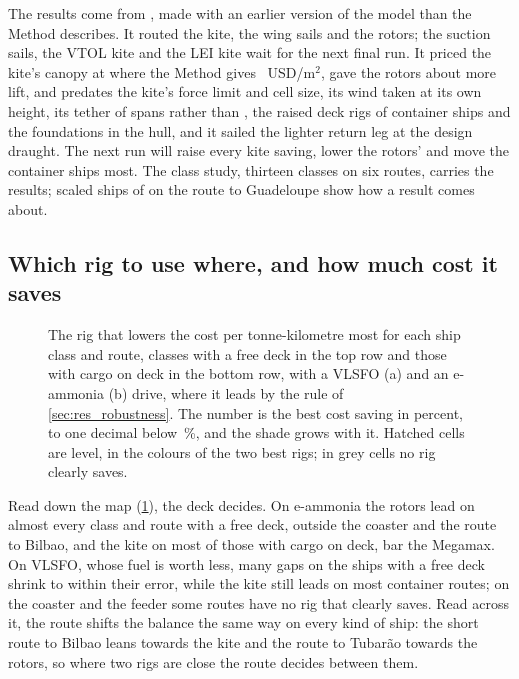 The results come from \NumResultsRun{}, made with an earlier version of the model than the Method describes. It routed the kite, the wing sails and the rotors; the suction sails, the VTOL kite and the LEI kite wait for the next final run. It priced the kite's canopy at  where the Method gives \NumCanopyPrice{}~USD/m$^2$, gave the rotors about  more lift, and predates the kite's force limit and cell size, its wind taken at its own height, its tether of  spans rather than , the raised deck rigs of container ships and the foundations in the hull, and it sailed the lighter return leg at the design draught.   The next run will raise every kite saving, lower the rotors' and move the container ships most. The class study, thirteen classes on six routes, carries the results; scaled ships of  on the route to Guadeloupe show how a result comes about.

\subsection{Which rig to use where, and how much cost it saves}
\label{sec:res_fuel}
\label{sec:res_routes}

\begin{figure}[tbp]
\centering
{}
\caption{The rig that lowers the cost per tonne-kilometre most for each ship class and route, classes with a free deck in the top row and those with cargo on deck in the bottom row, with a VLSFO (a) and an e-ammonia (b) drive, where it leads by the rule of \cref{sec:res_robustness}. The number is the best cost saving in percent, to one decimal below \,\%, and the shade grows with it. Hatched cells are level, in the colours of the two best rigs; in grey cells no rig clearly saves.}
\label{fig:winner_map}
\end{figure}

Read down the map (\cref{fig:winner_map}), the deck decides. On e-ammonia the rotors lead on almost every class and route with a free deck, outside the coaster and the route to Bilbao, and the kite on most of those with cargo on deck, bar the Megamax. On VLSFO, whose fuel is worth less, many gaps on the ships with a free deck shrink to within their error, while the kite still leads on most container routes; on the coaster and the feeder some routes have no rig that clearly saves. Read across it, the route shifts the balance the same way on every kind of ship: the short route to Bilbao leans towards the kite and the route to Tubarão towards the rotors, so where two rigs are close the route decides between them.

